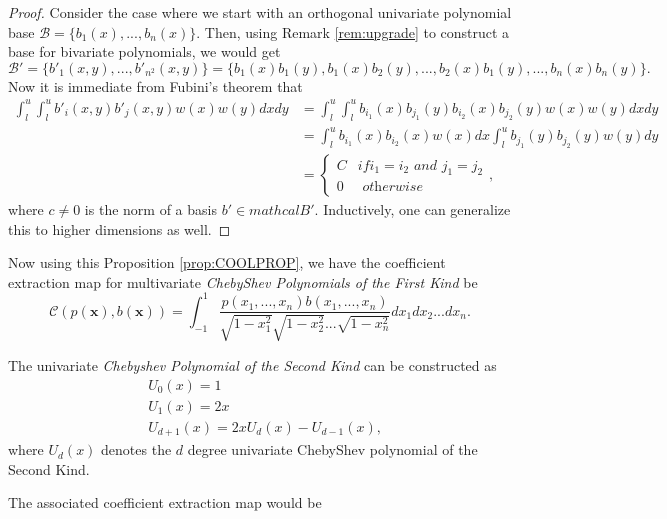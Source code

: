 \documentclass[12pt]{amsart}
\numberwithin{equation}{section}
\theoremstyle{definition}
\numberwithin{thm}{section}
\begin{document}
\begin{proof}
     Consider the case where we start with an orthogonal univariate polynomial base $\mathcal{B} = \{b_1(x), ..., b_n(x)\}$. 
     Then, using Remark \ref{rem:upgrade} to construct a base for bivariate polynomials, we would get 
     \begin{equation*}
          \mathcal{B}' =  \{b'_1(x, y), ..., b'_{n^2}(x, y)\} = \{b_1(x)b_1(y), b_1(x)b_2(y), ..., b_2(x)b_1(y), ..., b_n(x)b_n(y)\}.
     \end{equation*}
     Now it is immediate from Fubini's theorem that
     \begin{align*}
          \int_l^u \int_l^u  b'_i(x, y)b'_j(x, y)w(x)w(y) dx dy  & = \int_l^u \int_l^u  b_{i_1}(x) b_{j_1}(y) b_{i_2}(x)b_{j_2}(y) w(x)w(y) dx dy \\
               & = \int_l^u  b_{i_1}(x) b_{i_2}(x) w(x) dx  \int_l^u b_{j_1}(y) b_{j_2}(y) w(y) dy \\
               & = \begin{cases}
                    C & if i_1 = i_2 \textit{ and } j_1 = j_2\\
                    0 & \textit{ otherwise }
              \end{cases},
     \end{align*}
     where $c \neq 0$ is the norm of a basis $b' \in mathcal{B}'$.
     Inductively, one can generalize this to higher dimensions as well.
\end{proof}

Now using this Proposition \ref{prop:COOLPROP}, we have the {coefficient extraction map} for multivariate \emph{ChebyShev Polynomials of the First Kind} be
\begin{equation*}
     \mathcal{C}(p(\mathbf{x}), b(\mathbf{x})) = \int_{-1}^1 \frac{p(x_1, ..., x_n)b(x_1, ..., x_n)}{\sqrt{1-x_1^2} \sqrt{1-x_2^2} ... \sqrt{1-x_n^2}} dx_1dx_2 ... dx_n.
\end{equation*} 

The univariate \emph{Chebyshev Polynomial of the Second Kind} can be constructed as
\begin{align*} 
     &U_0(x) = 1 \\ 
     &U_1(x) = 2x \\
     &U_{d+1}(x) = 2x U_d(x) - U_{d-1}(x),
\end{align*}
where $U_d(x)$ denotes the $d$ degree univariate ChebyShev polynomial of the Second Kind.

The associated {coefficient extraction map} would be
\end{document}
